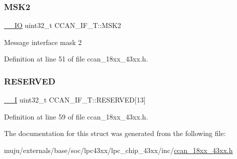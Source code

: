 \subsubsection{\texorpdfstring{M\+S\+K2}{MSK2}}
{\footnotesize\ttfamily \hyperlink{core__sc300_8h_aec43007d9998a0a0e01faede4133d6be}{\+\_\+\+\_\+\+IO} uint32\+\_\+t C\+C\+A\+N\+\_\+\+I\+F\+\_\+\+T\+::\+M\+S\+K2}

Message interface mask 2 

Definition at line 51 of file ccan\+\_\+18xx\+\_\+43xx.\+h.

\mbox{\label{struct_c_c_a_n___i_f___t_a140e0a58a7e38275d2eb77f6a262708b}} 
\subsubsection{\texorpdfstring{R\+E\+S\+E\+R\+V\+ED}{RESERVED}}
{\footnotesize\ttfamily \hyperlink{core__sc300_8h_af63697ed9952cc71e1225efe205f6cd3}{\+\_\+\+\_\+I} uint32\+\_\+t C\+C\+A\+N\+\_\+\+I\+F\+\_\+\+T\+::\+R\+E\+S\+E\+R\+V\+ED\mbox{[}13\mbox{]}}



Definition at line 59 of file ccan\+\_\+18xx\+\_\+43xx.\+h.



The documentation for this struct was generated from the following file\+:\begin{DoxyCompactItemize}
\item 
muju/externals/base/soc/lpc43xx/lpc\+\_\+chip\+\_\+43xx/inc/\hyperlink{ccan__18xx__43xx_8h}{ccan\+\_\+18xx\+\_\+43xx.\+h}\end{DoxyCompactItemize}
